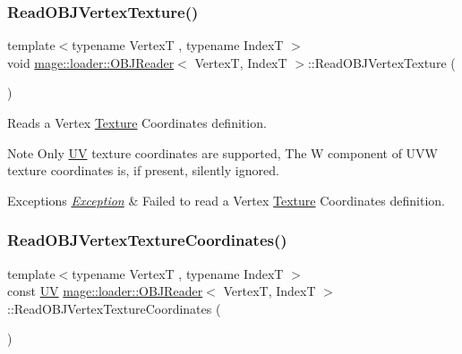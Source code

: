 \subsubsection{\texorpdfstring{Read\+O\+B\+J\+Vertex\+Texture()}{ReadOBJVertexTexture()}}
{\footnotesize\ttfamily template$<$typename VertexT , typename IndexT $>$ \\
void \hyperlink{classmage_1_1loader_1_1_o_b_j_reader}{mage\+::loader\+::\+O\+B\+J\+Reader}$<$ VertexT, IndexT $>$\+::Read\+O\+B\+J\+Vertex\+Texture (\begin{DoxyParamCaption}{ }\end{DoxyParamCaption})\hspace{0.3cm}{\ttfamily [private]}}

Reads a Vertex \hyperlink{classmage_1_1_texture}{Texture} Coordinates definition.

\begin{DoxyNote}{Note}
Only \hyperlink{structmage_1_1_u_v}{UV} texture coordinates are supported, The W component of U\+VW texture coordinates is, if present, silently ignored. 
\end{DoxyNote}

\begin{DoxyExceptions}{Exceptions}
{\em \hyperlink{classmage_1_1_exception}{Exception}} & Failed to read a Vertex \hyperlink{classmage_1_1_texture}{Texture} Coordinates definition. \\
\hline
\end{DoxyExceptions}
\hypertarget{classmage_1_1loader_1_1_o_b_j_reader_acb7b69622e6dbd85149377819ae8b997}{}\label{classmage_1_1loader_1_1_o_b_j_reader_acb7b69622e6dbd85149377819ae8b997} 
\subsubsection{\texorpdfstring{Read\+O\+B\+J\+Vertex\+Texture\+Coordinates()}{ReadOBJVertexTextureCoordinates()}}
{\footnotesize\ttfamily template$<$typename VertexT , typename IndexT $>$ \\
const \hyperlink{structmage_1_1_u_v}{UV} \hyperlink{classmage_1_1loader_1_1_o_b_j_reader}{mage\+::loader\+::\+O\+B\+J\+Reader}$<$ VertexT, IndexT $>$\+::Read\+O\+B\+J\+Vertex\+Texture\+Coordinates (\begin{DoxyParamCaption}{ }\end{DoxyParamCaption})\hspace{0.3cm}{\ttfamily [private]}}

